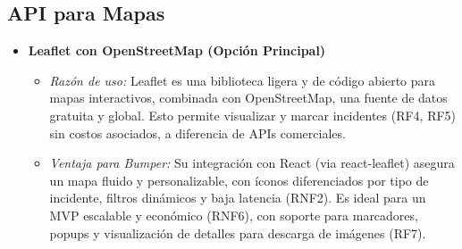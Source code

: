 \subsection*{API para Mapas}
\begin{itemize}
    \item \textbf{Leaflet con OpenStreetMap (Opción Principal)}
    \begin{itemize}
        \item \textit{Razón de uso:} Leaflet es una biblioteca ligera y de código abierto para mapas interactivos, combinada con OpenStreetMap, una fuente de datos gratuita y global. Esto permite visualizar y marcar incidentes (RF4, RF5) sin costos asociados, a diferencia de APIs comerciales.
        \item \textit{Ventaja para Bumper:} Su integración con React (via react-leaflet) asegura un mapa fluido y personalizable, con íconos diferenciados por tipo de incidente, filtros dinámicos y baja latencia (RNF2). Es ideal para un MVP escalable y económico (RNF6), con soporte para marcadores, popups y visualización de detalles para descarga de imágenes (RF7).
    \end{itemize}
\end{itemize}